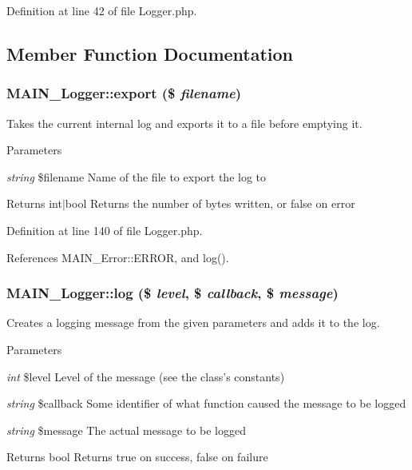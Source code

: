 Definition at line 42 of file Logger.php.

\subsection{Member Function Documentation}
\hypertarget{classMAIN__Logger_aeb44a3f5e4ce98ab2380743b28c9ac44}{
\subsubsection[{export}]{\setlength{\rightskip}{0pt plus 5cm}MAIN\_\-Logger::export (\$ {\em filename})}}
\label{d3/dff/classMAIN__Logger_aeb44a3f5e4ce98ab2380743b28c9ac44}
Takes the current internal log and exports it to a file before emptying it.


\begin{DoxyParams}{Parameters}
\item[{\em string}]\$filename Name of the file to export the log to\end{DoxyParams}
\begin{DoxyReturn}{Returns}
int$|$bool Returns the number of bytes written, or false on error 
\end{DoxyReturn}


Definition at line 140 of file Logger.php.

References MAIN\_\-Error::ERROR, and log().\hypertarget{classMAIN__Logger_a06d6ccbf1df65ec1bbdc88d88453fbd2}{
\subsubsection[{log}]{\setlength{\rightskip}{0pt plus 5cm}MAIN\_\-Logger::log (\$ {\em level}, \/  \$ {\em callback}, \/  \$ {\em message})}}
\label{d3/dff/classMAIN__Logger_a06d6ccbf1df65ec1bbdc88d88453fbd2}
Creates a logging message from the given parameters and adds it to the log.


\begin{DoxyParams}{Parameters}
\item[{\em int}]\$level Level of the message (see the class's constants) \item[{\em string}]\$callback Some identifier of what function caused the message to be logged \item[{\em string}]\$message The actual message to be logged\end{DoxyParams}
\begin{DoxyReturn}{Returns}
bool Returns true on success, false on failure 
\end{DoxyReturn}


